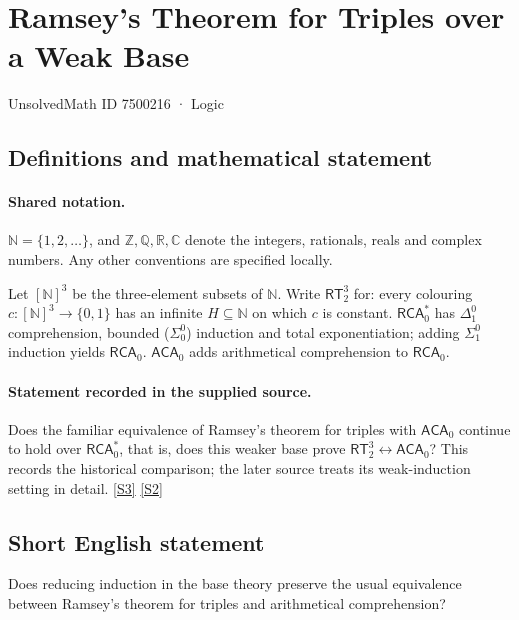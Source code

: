 \documentclass[11pt]{article}
\newcommand{\sref}[2]{\hyperlink{source:#1:#2}{[S#2]}}
\begin{document}
\setcounter{section}{7500215}
\section{Ramsey's Theorem for Triples over a Weak Base}\label{7500216}
{\small\sffamily UnsolvedMath ID 7500216 · Logic}
\subsection{Definitions and mathematical statement}

\paragraph{Shared notation.}$\mathbb N=\{1,2,\ldots\}$, and $\mathbb Z,\mathbb Q,\mathbb R,\mathbb C$ denote the integers, rationals, reals and complex numbers. Any other conventions are specified locally.


Let $[\mathbb N]^3$ be the three-element subsets of $\mathbb N$. Write $\mathsf{RT}^3_2$ for: every colouring $c:[\mathbb N]^3\to\{0,1\}$ has an infinite $H\subseteq\mathbb N$ on which $c$ is constant. $\mathsf{RCA}_0^*$ has $\Delta^0_1$ comprehension, bounded ($\Sigma^0_0$) induction and total exponentiation; adding $\Sigma^0_1$ induction yields $\mathsf{RCA}_0$. $\mathsf{ACA}_0$ adds arithmetical comprehension to $\mathsf{RCA}_0$.
\paragraph{Statement recorded in the supplied source.}
Does the familiar equivalence of Ramsey's theorem for triples with $\mathsf{ACA}_0$ continue to hold over $\mathsf{RCA}_0^*$, that is, does this weaker base prove $\mathsf{RT}^3_2\leftrightarrow\mathsf{ACA}_0$? This records the historical comparison; the later source treats its weak-induction setting in detail. \sref{7500216}{3} \sref{7500216}{2}
\subsection{Short English statement}
Does reducing induction in the base theory preserve the usual equivalence between Ramsey's theorem for triples and arithmetical comprehension?
\end{document}

